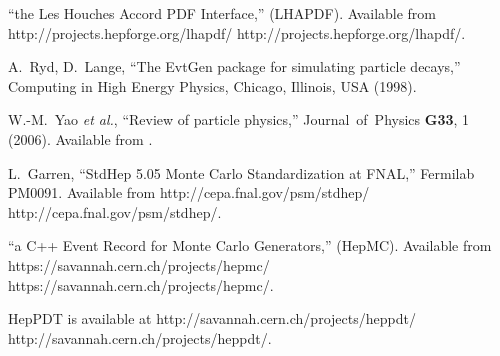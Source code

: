 \documentclass[11pt,letterpaper]{article}
\begin{document}
\begin{thebibliography}{99}
  ``the Les Houches Accord PDF Interface,'' (LHAPDF).
  Available from 
  \htmladdnormallink
  {http://projects.hepforge.org/lhapdf/}
  {http://projects.hepforge.org/lhapdf/}.

  A.~Ryd, D.~Lange,
  ``The EvtGen package for simulating particle decays,''
  Computing in High Energy Physics, Chicago, Illinois, USA (1998).

  W.-M.~Yao {\it et al.}, ``Review of particle physics,''
  Journal\ of\ Physics {\bf G33}, 1 (2006).
  Available from .


  L.~Garren, ``StdHep 5.05 Monte Carlo Standardization at FNAL,''
  Fermilab PM0091. Available from 
  \htmladdnormallink
  {http://cepa.fnal.gov/psm/stdhep/}
  {http://cepa.fnal.gov/psm/stdhep/}.

  ``a C++ Event Record for Monte Carlo Generators,'' (HepMC).
  Available from 
  \htmladdnormallink
  {https://savannah.cern.ch/projects/hepmc/}
  {https://savannah.cern.ch/projects/hepmc/}.

  HepPDT is available at \htmladdnormallink
  {http://savannah.cern.ch/projects/heppdt/}
  {http://savannah.cern.ch/projects/heppdt/}.

\end{thebibliography}

%
%
\end{document}
